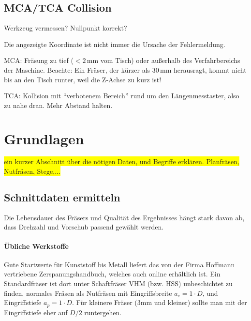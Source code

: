 \documentclass{\basedir/fablab-document}
\renewcommand{\todo}[1]{\colorbox{yellow}{{#1}}}
\begin{document}
\subsection{MCA/TCA Collision}
Werkzeug vermessen? Nullpunkt korrekt?

Die angezeigte Koordinate ist nicht immer die Ursache der Fehlermeldung.

MCA: Fräsung zu tief ($<2$\,mm vom Tisch) oder außerhalb des Verfahrbereichs der Maschine. Beachte: Ein Fräser, der kürzer als 30\,mm herausragt, kommt nicht bis an den Tisch runter, weil die Z-Achse zu kurz ist!

TCA: Kollision mit \enquote{verbotenem Bereich} rund um den Längenmesstaster, also zu nahe dran. Mehr Abstand halten.

\section{Grundlagen}
\todo{ein kurzer Abschnitt über die nötigen Daten, und Begriffe erklären. Planfräsen, Nutfräsen, Stege,...}

\subsection{Schnittdaten ermitteln}

Die Lebensdauer des Fräsers und Qualität des Ergebnisses hängt stark davon ab, dass Drehzahl und Vorschub passend gewählt werden.

\paragraph{Übliche Werkstoffe} Gute Startwerte für Kunststoff bis Metall liefert das von der Firma Hoffmann vertriebene Zerspanungshandbuch, welches auch online erhältlich ist. Ein Standardfräser ist dort unter Schaftfräser VHM (bzw. HSS) unbeschichtet zu finden, normales Fräsen als Nutfräsen mit Eingriffsbreite $a_e=1\cdot D$, und Eingriffstiefe $a_p=1 \cdot D$. Für kleinere Fräser (3mm und kleiner) sollte man mit der Eingriffstiefe eher auf $D/2$ runtergehen.
\end{document}
